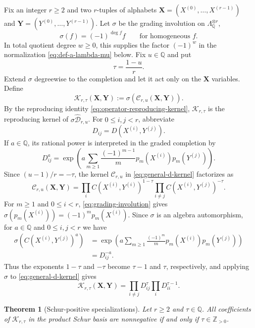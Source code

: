 \documentclass[12pt,reqno,a4paper]{amsart}
\numberwithin{equation}{section}
\numberwithin{figure}{section}
\theoremstyle{plain}
\newtheorem{theorem}{Theorem}[section]
\theoremstyle{definition}
\begin{document}
Fix an integer $r\geq2$ and two $r$-tuples of alphabets
$\mathbf X=(X^{(0)},\ldots,X^{(r-1)})$ and
$\mathbf Y=(Y^{(0)},\ldots,Y^{(r-1)})$.
Let $\sigma$ be the grading involution on
$\Lambda_{\mathbb Q}^{\otimes r}$,
\begin{equation}\label{eq:grading-involution}
 \sigma(f)=(-1)^{\deg f}f
 \qquad\text{for homogeneous }f.
\end{equation}
In total quotient degree $w\geq0$, this supplies the factor
$(-1)^w$ in the normalization \eqref{eq:def-a-lambda-mu} below.
Fix $u\in\mathbb Q$ and put
\[
 \tau=\frac{1-u}{r}.
\]
Extend $\sigma$ degreewise to the completion and let it act only on
the $\mathbf X$ variables. Define
\[
 \mathcal K_{r,\tau}(\mathbf X,\mathbf Y)
 :=\sigma\!\left(\mathcal C_{r,u}(\mathbf X,\mathbf Y)\right).
\]
By the reproducing identity \eqref{eq:operator-reproducing-kernel},
$\mathcal K_{r,\tau}$ is the reproducing kernel of
$\sigma\widehat{\mathcal D}_{r,u}$.
For $0\leq i,j<r$, abbreviate
\[
 D_{ij}=D(X^{(i)},Y^{(j)}).
\]
If $a\in\mathbb Q$, its rational power is interpreted in the graded
completion by
\[
 D_{ij}^{a}
 =\exp\left(
   a\sum_{m\geq1}\frac{(-1)^{m-1}}m
   p_m(X^{(i)})p_m(Y^{(j)})
  \right).
\]
Since $(u-1)/r=-\tau$, the kernel $\mathcal C_{r,u}$ in
\eqref{eq:general-d-kernel} factorizes as
\[
 \mathcal C_{r,u}(\mathbf X,\mathbf Y)
 =\prod_i C(X^{(i)},Y^{(i)})^{1-\tau}
  \prod_{i\neq j}C(X^{(i)},Y^{(j)})^{-\tau}.
\]
For $m\geq1$ and $0\leq i<r$, \eqref{eq:grading-involution} gives
$\sigma(p_m(X^{(i)}))=(-1)^m p_m(X^{(i)})$.
Since $\sigma$ is an algebra automorphism, for $a\in\mathbb Q$ and
$0\leq i,j<r$ we have
\[
\begin{aligned}
 \sigma\!\left(C(X^{(i)},Y^{(j)})^a\right)
 &=\exp\left(
    a\sum_{m\geq1}\frac{(-1)^m}{m}
    p_m(X^{(i)})p_m(Y^{(j)})\right)\\
 &=D_{ij}^{-a}.
\end{aligned}
\]
Thus the exponents $1-\tau$ and $-\tau$ become $\tau-1$ and
$\tau$, respectively, and applying $\sigma$ to
\eqref{eq:general-d-kernel} gives
\begin{equation}\label{eq:kernel-rt}
 \mathcal K_{r,\tau}(\mathbf X,\mathbf Y)
 =\prod_{i\neq j}D_{ij}^{\tau}
  \prod_iD_{ii}^{\tau-1}.
\end{equation}

\begin{theorem}[Schur-positive specializations]
\label{thm:schur-positive-specializations}
Let $r\geq2$ and $\tau\in\mathbb Q$.  All coefficients of
$\mathcal K_{r,\tau}$ in the product Schur basis are nonnegative if and
only if $\tau\in\mathbb Z_{>0}$.
\end{theorem}
\end{document}
